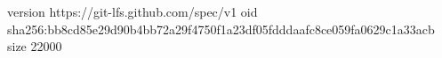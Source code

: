 version https://git-lfs.github.com/spec/v1
oid sha256:bb8cd85e29d90b4bb72a29f4750f1a23df05fdddaafc8ce059fa0629c1a33acb
size 22000
